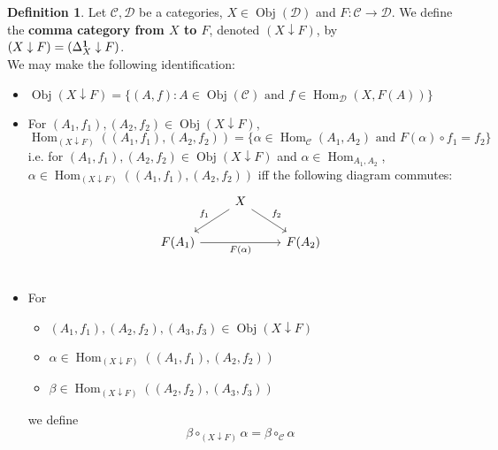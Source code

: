 \documentclass{book}
\theoremstyle{definition}
\newtheorem{defn}[definition]{Definition}
\newcommand{\al}{\alpha}
\newcommand{\be}{\beta}
\newcommand{\Del}{\Delta}
\newcommand{\MC}{\mathcal{C}}
\newcommand{\MD}{\mathcal{D}}
\DeclareMathOperator{\Obj}{Obj}
\DeclareMathOperator{\Hom}{Hom}
\DeclareMathOperator*{\0}{\mbf{0}}
\DeclareMathOperator*{\1}{\mbf{1}}
\begin{document}
	\begin{defn}
		Let $\MC, \MD$ be a categories, $X \in \Obj(\MD)$ and $F: \MC \rightarrow \MD$. We define the \textbf{comma category from $X$ to $F$}, denoted $(X \downarrow F)$, by $(X \downarrow F) = (\Del^{\1}_X \downarrow F)$. \\
		We may make the following identification:
		\begin{itemize}
			\item $\Obj(X \downarrow F) = \{(A, f): A \in \Obj(\MC) \text{ and } f \in \Hom_{\MD}(X, F(A))\}$ 
			\item For $(A_1, f_1), (A_2, f_2) \in \Obj(X \downarrow F)$, 
			$$\Hom_{(X \downarrow F)}((A_1, f_1), (A_2, f_2)) = \{\al \in \Hom_{\MC}(A_1, A_2) \text{ and } F(\al) \circ f_1 = f_2\}$$
			i.e. for $(A_1, f_1), (A_2, f_2) \in \Obj(X \downarrow F)$ and $\al \in \Hom_{A_1, A_2}$, $\al \in \Hom_{(X \downarrow F)}((A_1, f_1), (A_2, f_2))$ iff the following diagram commutes:
			\[ 
			\begin{tikzcd}
				&  X \arrow[dl, "f_1"']  \arrow[dr, "f_2"] & \\
				F(A_1)  \arrow[rr, "F(\al)"'] &&  F(A_2) \\ 
			\end{tikzcd}
			\]
			\item For 
			\begin{itemize}
				\item $(A_1, f_1), (A_2, f_2), (A_3, f_3) \in \Obj(X \downarrow F)$
				\item $\al \in \Hom_{(X \downarrow F)}((A_1, f_1), (A_2, f_2))$
				\item $\be \in \Hom_{(X \downarrow F)}((A_2, f_2), (A_3, f_3))$
			\end{itemize}
			we define 
			$$\be \circ_{(X \downarrow F)} \al = \be \circ_{\MC} \al $$
		\end{itemize}
	\end{defn}
\end{document}
